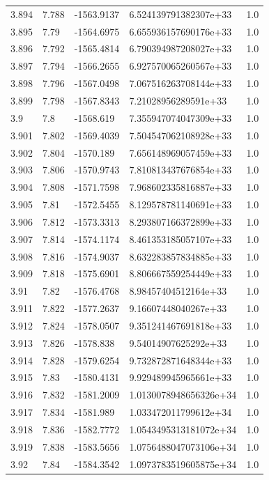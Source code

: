 \begin{tabular}{lllll}
3.894 & 7.788 & -1563.9137 & 6.524139791382307e+33 & 1.0 \\
3.895 & 7.79 & -1564.6975 & 6.655936157690176e+33 & 1.0 \\
3.896 & 7.792 & -1565.4814 & 6.790394987208027e+33 & 1.0 \\
3.897 & 7.794 & -1566.2655 & 6.927570065260567e+33 & 1.0 \\
3.898 & 7.796 & -1567.0498 & 7.067516263708144e+33 & 1.0 \\
3.899 & 7.798 & -1567.8343 & 7.21028956289591e+33 & 1.0 \\
3.9 & 7.8 & -1568.619 & 7.355947074047309e+33 & 1.0 \\
3.901 & 7.802 & -1569.4039 & 7.504547062108928e+33 & 1.0 \\
3.902 & 7.804 & -1570.189 & 7.656148969057459e+33 & 1.0 \\
3.903 & 7.806 & -1570.9743 & 7.810813437676854e+33 & 1.0 \\
3.904 & 7.808 & -1571.7598 & 7.968602335816887e+33 & 1.0 \\
3.905 & 7.81 & -1572.5455 & 8.129578781140691e+33 & 1.0 \\
3.906 & 7.812 & -1573.3313 & 8.293807166372899e+33 & 1.0 \\
3.907 & 7.814 & -1574.1174 & 8.461353185057107e+33 & 1.0 \\
3.908 & 7.816 & -1574.9037 & 8.632283857834885e+33 & 1.0 \\
3.909 & 7.818 & -1575.6901 & 8.806667559254449e+33 & 1.0 \\
3.91 & 7.82 & -1576.4768 & 8.98457404512164e+33 & 1.0 \\
3.911 & 7.822 & -1577.2637 & 9.16607448040267e+33 & 1.0 \\
3.912 & 7.824 & -1578.0507 & 9.351241467691818e+33 & 1.0 \\
3.913 & 7.826 & -1578.838 & 9.54014907625292e+33 & 1.0 \\
3.914 & 7.828 & -1579.6254 & 9.732872871648344e+33 & 1.0 \\
3.915 & 7.83 & -1580.4131 & 9.929489945965661e+33 & 1.0 \\
3.916 & 7.832 & -1581.2009 & 1.0130078948656326e+34 & 1.0 \\
3.917 & 7.834 & -1581.989 & 1.033472011799612e+34 & 1.0 \\
3.918 & 7.836 & -1582.7772 & 1.0543495313181072e+34 & 1.0 \\
3.919 & 7.838 & -1583.5656 & 1.0756488047073106e+34 & 1.0 \\
3.92 & 7.84 & -1584.3542 & 1.0973783519605875e+34 & 1.0 \\

\end{tabular}
